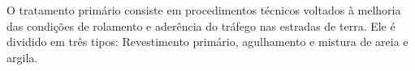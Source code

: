 
O tratamento primário consiste em procedimentos técnicos voltados à melhoria das condições de rolamento e aderência do tráfego nas estradas de terra. Ele é dividido em três tipos: Revestimento primário, agulhamento e mistura de areia e argila.